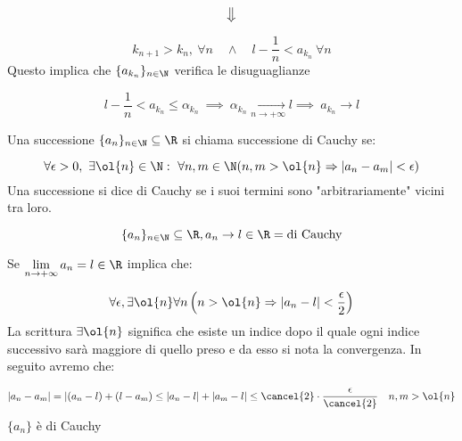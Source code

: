 \documentclass[../appunti.tex]{subfiles}
\begin{document}
\begin{dimo}
\begin{equation*}
	\big\Downarrow
\end{equation*}

\begin{equation}
	k_{n+1} > k_n, \ \forall n \quad \land \quad 
	l - \frac{1}{n} < a_{k_n}\ \forall n
\end{equation}
Questo implica che $ \{ a_{k_n} \}_{n \in \N}$ verifica le disuguaglianze

\begin{equation}
	l - \frac{1}{n} < a_{k_n} \leq \alpha_{k_n}\ \implies\ 
	\alpha_{k_n} \underset{n \to + \infty}{\to} l \implies\
	a_{k_n} \to l
\end{equation}

\end{dimo}

\begin{defn}
	Una successione $ \{ a_n \}_{n \in \N} \subseteq \R $ si chiama successione di Cauchy se:

\begin{equation}
	\forall \epsilon > 0,\ \exists \ol{n} \in \N:\ \forall n,m \in \N 
	(n,m > \ol{n} \Rightarrow | a_n - a_m | < \epsilon )
\end{equation}
Una successione si dice di Cauchy se i suoi termini sono "arbitrariamente" vicini tra loro.
\end{defn}

\begin{defn}

\begin{equation}
	\{ a_n \}_{n \in \N} \subseteq \R, a_n \to l \in \R = \mbox{di Cauchy}
\end{equation}
\end{defn}

\begin{dimo} 
Se $ \lim \limits_{n \to + \infty} a_n = l \in \R $ implica che:

\begin{equation}
	\forall \epsilon, \exists \ol{n} \forall n 
	\left( n > \ol{n} \Rightarrow | a_n - l | < \frac{\epsilon}{2} \right)
\end{equation}
La scrittura $ \exists \ol{n} $ significa che esiste un indice dopo il quale 
ogni indice successivo sarà maggiore di quello preso e da esso si nota la convergenza.
In seguito avremo che:

\begin{equation}
	| a_n - a_m | = | (a_n - l) + (l - a_m) \leq 
	| a_n - l | + | a_m - l | \leq \cancel{2} \cdot \frac{\epsilon}{\cancel{2}}
	\quad n,m > \ol{n}
\end{equation}
$ \{ a_n \} $ è di Cauchy 
\end{dimo}
\end{document}

